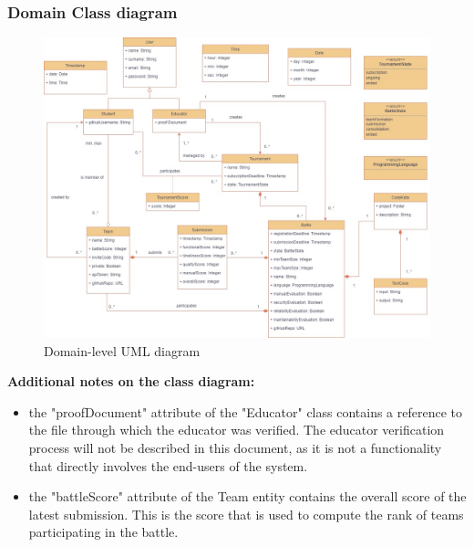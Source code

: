 \begin{enumerate}[label=\textbf{\arabic*}.]
\end{enumerate}

\subsubsection{Domain Class diagram}
\begin{figure}[H]
    \hspace{-98px}
    \includegraphics[scale=0.5]{Diagrams/uml_v2.jpg}
    \caption{Domain-level UML diagram}
    \label{class_diagram}
\end{figure}
\newpage
\textbf{ Additional notes on the class diagram:}
\begin{itemize}
    \item the "proofDocument" attribute of the "Educator" class contains a reference to the file through which the educator was verified. The educator verification process will not be described in this document, as it is not a functionality that directly involves the end-users of the system.
    \item the "battleScore" attribute of the Team entity contains the overall score of the latest submission. This is the score that is used to compute the rank of teams participating in the battle.
\end{itemize}

